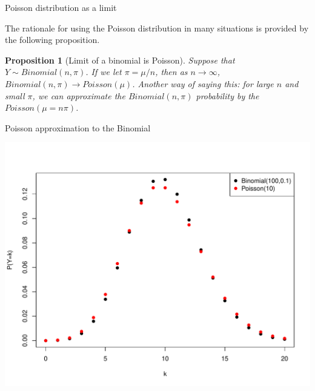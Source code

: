 \documentclass[handout]{beamer}\usepackage[]{graphicx}\usepackage[]{color}
\newenvironment{knitrout}{}{} %
\newtheorem{proposition}[theorem]{Proposition}
\begin{document}
\begin{frame}{Poisson distribution as a limit}

The rationale for using the Poisson distribution in many situations is provided by the following proposition.

\vspace*{0.5in}

\begin{proposition}[Limit of a binomial is Poisson]
Suppose that $Y \sim Binomial(n,\pi)$. If we let $\pi = \mu/n$, then as $n \rightarrow \infty$, $Binomial(n,\pi) \rightarrow Poisson(\mu)$. Another way of saying this: for large $n$ and small $\pi$, we can approximate the $Binomial(n,\pi)$ probability by the $Poisson(\mu = n\pi)$. 
\end{proposition}

\end{frame}


\begin{frame}{Poisson approximation to the Binomial}


\begin{knitrout}\scriptsize
{}\color{fgcolor}

{\centering \includegraphics[width=1\linewidth]{figure/unnamed-chunk-8-1} 

}



\end{knitrout}

\end{frame}
\end{document}

